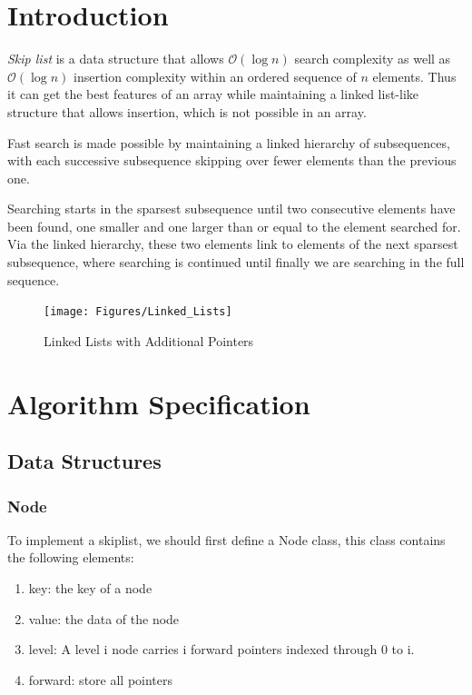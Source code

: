 \documentclass[10pt,english, openany]{book}
\begin{document}
\tableofcontents{}

\mainmatter

\chapter{Introduction}
\textit{Skip list} is a data structure that allows $\mathcal O(\log n)$ search complexity as well as $\mathcal O(\log n)$ insertion complexity within an ordered sequence of $n$ elements. Thus it can get the best features of an array while maintaining a linked list-like structure that allows insertion, which is not possible in an array. 

Fast search is made possible by maintaining a linked hierarchy of subsequences, with each successive subsequence skipping over fewer elements than the previous one. 

Searching starts in the sparsest subsequence until two consecutive elements have been found, one smaller and one larger than or equal to the element searched for. Via the linked hierarchy, these two elements link to elements of the next sparsest subsequence, where searching is continued until finally we are searching in the full sequence.
\vspace{2cm}
\begin{figure}[h]
	\centering
	\texttt{[image: Figures/Linked\_Lists]}
	\caption{Linked Lists with Additional Pointers}
\end{figure}
\chapter{Algorithm Specification}
\section{Data Structures}
\subsection{Node}
To implement a skiplist, we should first define a Node class, this class contains the following elements:
\begin{enumerate}
	\item key: the key of a node
	\item value: the data of the node
	\item level: A level i node carries i forward pointers indexed through 0 to i.
	\item forward: store all pointers
\end{enumerate}
\end{document}

